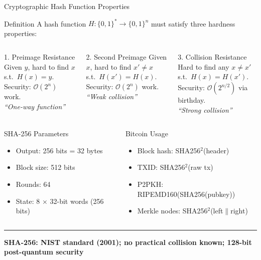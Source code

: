 \documentclass[8pt,aspectratio=169]{beamer}
\newcommand{\bottomnote}[1]{\vfill\vspace{-2mm}\textcolor{mllavender2}{\rule{\textwidth}{0.4pt}}\vspace{1mm}\footnotesize\textbf{#1}}
\begin{document}
\begin{frame}{Cryptographic Hash Function Properties}
\begin{block}{Definition}
A hash function $H:\{0,1\}^*\to\{0,1\}^n$ must satisfy three hardness properties:
\end{block}
\vspace{2mm}
\begin{columns}
\begin{block}{1. Preimage Resistance}
Given $y$, hard to find $x$ s.t.\ $H(x)=y$.\\[4pt]
\small Security: $\mathcal{O}(2^n)$ work.\\[4pt]
\textit{``One-way function''}
\end{block}
\begin{block}{2. Second Preimage}
Given $x$, hard to find $x'\neq x$ s.t.\ $H(x')=H(x)$.\\[4pt]
\small Security: $\mathcal{O}(2^n)$ work.\\[4pt]
\textit{``Weak collision''}
\end{block}
\begin{block}{3. Collision Resistance}
Hard to find any $x\neq x'$ s.t.\ $H(x)=H(x')$.\\[4pt]
\small Security: $\mathcal{O}(2^{n/2})$ via birthday.\\[4pt]
\textit{``Strong collision''}
\end{block}
\end{columns}
\vspace{3mm}
\begin{columns}
\begin{block}{SHA-256 Parameters}
\begin{itemize}\small
  \item Output: 256 bits = 32 bytes
  \item Block size: 512 bits
  \item Rounds: 64
  \item State: 8 $\times$ 32-bit words (256 bits)
\end{itemize}
\end{block}
\begin{block}{Bitcoin Usage}
\begin{itemize}\small
  \item Block hash: SHA256$^2$(header)
  \item TXID: SHA256$^2$(raw tx)
  \item P2PKH: RIPEMD160(SHA256(pubkey))
  \item Merkle nodes: SHA256$^2$(left$\|$right)
\end{itemize}
\end{block}
\end{columns}
\bottomnote{SHA-256: NIST standard (2001); no practical collision known; 128-bit post-quantum security}
\end{frame}
\end{document}
